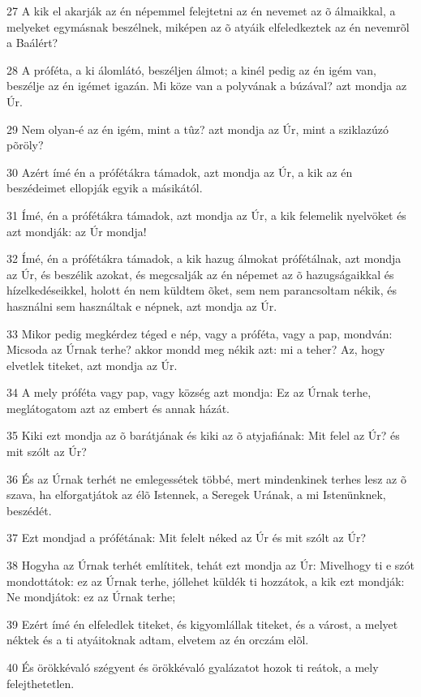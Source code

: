 \par 27 A kik el akarják az én népemmel felejtetni az én nevemet az õ álmaikkal, a melyeket egymásnak beszélnek, miképen az õ atyáik elfeledkeztek az én nevemrõl a Baálért?
\par 28 A próféta, a ki álomlátó, beszéljen álmot; a kinél pedig az én igém van, beszélje az én igémet igazán. Mi köze van a polyvának a búzával? azt mondja az Úr.
\par 29 Nem olyan-é az én igém, mint a tûz? azt mondja az Úr, mint a sziklazúzó põröly?
\par 30 Azért ímé én a prófétákra támadok, azt mondja az Úr, a kik az én beszédeimet ellopják egyik a másikától.
\par 31 Ímé, én a prófétákra támadok, azt mondja az Úr, a kik felemelik nyelvöket és azt mondják: az Úr mondja!
\par 32 Ímé, én a prófétákra támadok, a kik hazug álmokat prófétálnak, azt mondja az Úr, és beszélik azokat, és megcsalják az én népemet az õ hazugságaikkal és hízelkedéseikkel, holott én nem küldtem õket, sem nem parancsoltam nékik, és használni sem használtak e népnek, azt mondja az Úr.
\par 33 Mikor pedig megkérdez téged e nép, vagy a próféta, vagy a pap, mondván: Micsoda az Úrnak terhe? akkor mondd meg nékik azt: mi a teher? Az, hogy elvetlek titeket, azt mondja az Úr.
\par 34 A mely próféta vagy pap, vagy község azt mondja: Ez az Úrnak terhe, meglátogatom azt az embert és annak házát.
\par 35 Kiki ezt mondja az õ barátjának és kiki az õ atyjafiának: Mit felel az Úr? és mit szólt az Úr?
\par 36 És az Úrnak terhét ne emlegessétek többé, mert mindenkinek terhes lesz az õ szava, ha elforgatjátok az élõ Istennek, a Seregek Urának, a mi Istenünknek, beszédét.
\par 37 Ezt mondjad a prófétának: Mit felelt néked az Úr és mit szólt az Úr?
\par 38 Hogyha az Úrnak terhét említitek, tehát ezt mondja az Úr: Mivelhogy ti e szót mondottátok: ez az Úrnak terhe, jóllehet küldék ti hozzátok, a kik ezt mondják: Ne mondjátok: ez az Úrnak terhe;
\par 39 Ezért ímé én elfeledlek titeket, és kigyomlállak titeket, és a várost, a melyet néktek és a ti atyáitoknak adtam, elvetem az én orczám elõl.
\par 40 És örökkévaló szégyent és örökkévaló gyalázatot hozok ti reátok, a mely felejthetetlen.

